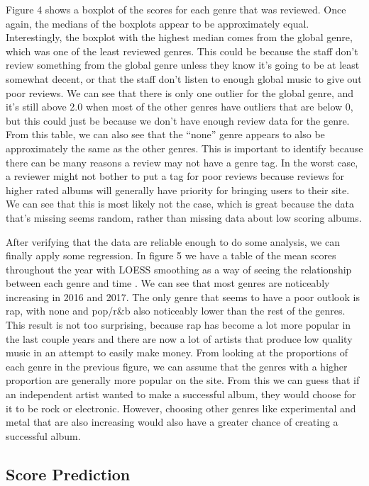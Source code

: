\documentclass{article}
\begin{document}
Figure 4 shows a boxplot of the scores for each genre that was reviewed.
Once again, the medians of the boxplots appear to be approximately
equal. Interestingly, the boxplot with the highest median comes from the
global genre, which was one of the least reviewed genres. This could be
because the staff don't review something from the global genre unless
they know it's going to be at least somewhat decent, or that the staff
don't listen to enough global music to give out poor reviews. We can see
that there is only one outlier for the global genre, and it's still
above 2.0 when most of the other genres have outliers that are below 0,
but this could just be because we don't have enough review data for the
genre. From this table, we can also see that the ``none'' genre appears
to also be approximately the same as the other genres. This is important
to identify because there can be many reasons a review may not have a
genre tag. In the worst case, a reviewer might not bother to put a tag
for poor reviews because reviews for higher rated albums will generally
have priority for bringing users to their site. We can see that this is
most likely not the case, which is great because the data that's missing
seems random, rather than missing data about low scoring albums.

After verifying that the data are reliable enough to do some analysis,
we can finally apply some regression. In figure 5 we have a table of the
mean scores throughout the year with LOESS smoothing as a way of seeing
the relationship between each genre and time \citep{kaggleUser}. We can
see that most genres are noticeably increasing in 2016 and 2017. The
only genre that seems to have a poor outlook is rap, with none and
pop/r\&b also noticeably lower than the rest of the genres. This result
is not too surprising, because rap has become a lot more popular in the
last couple years and there are now a lot of artists that produce low
quality music in an attempt to easily make money. From looking at the
proportions of each genre in the previous figure, we can assume that the
genres with a higher proportion are generally more popular on the site.
From this we can guess that if an independent artist wanted to make a
successful album, they would choose for it to be rock or electronic.
However, choosing other genres like experimental and metal that are also
increasing would also have a greater chance of creating a successful
album.

\subsection{Score Prediction}\label{score-prediction}
\end{document}
